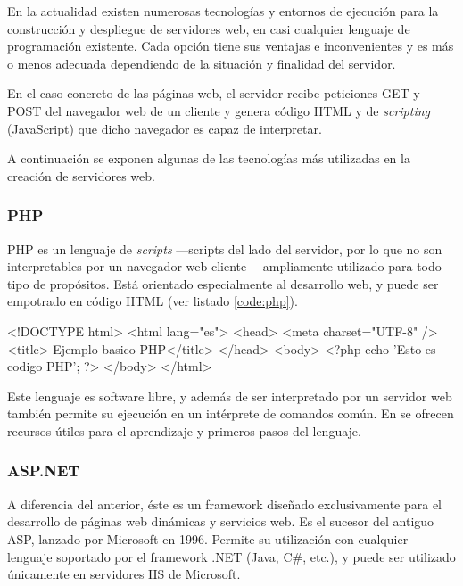 En la actualidad existen numerosas tecnologías y entornos de ejecución para la construcción y despliegue de servidores web, en casi cualquier lenguaje de programación existente. Cada opción tiene sus ventajas e inconvenientes y es más o menos adecuada dependiendo de la situación y finalidad del servidor.

En el caso concreto de las páginas web, el servidor recibe peticiones \acs{GET} y \acs{POST} del navegador web de un cliente y genera código \acs{HTML} y de {\it scripting} (JavaScript) que dicho navegador es capaz de interpretar.

A continuación se exponen algunas de las tecnologías más utilizadas en la creación de servidores web.

\subsubsection{PHP}

PHP es un lenguaje de {\it scripts} ---scripts del lado del servidor, por lo que no son interpretables por un navegador web cliente--- ampliamente utilizado para todo tipo de propósitos. Está orientado especialmente al desarrollo web, y puede ser empotrado en código \acs{HTML} (ver listado \ref{code:php}).

\begin{listing}[language=html, caption={Ejemplo de inclusión de código PHP en HTML}, label=code:php]
<!DOCTYPE html>
<html lang="es">
    <head>
        <meta charset="UTF-8" />
        <title> Ejemplo basico PHP</title>
    </head>
    <body>
        <?php
            echo 'Esto es codigo PHP';
        ?>
    </body>
</html>
\end{listing}

Este lenguaje es software libre, y además de ser interpretado por un servidor web también permite su ejecución en un intérprete de comandos común. En \cite{php} se ofrecen recursos útiles para el aprendizaje y primeros pasos del lenguaje.

\subsubsection{ASP.NET}

A diferencia del anterior, éste es un framework diseñado exclusivamente para el desarrollo de páginas web dinámicas y servicios web. Es el sucesor del antiguo \acs{ASP}, lanzado por Microsoft en 1996. Permite su utilización con cualquier lenguaje soportado por el framework .NET (Java, C\#, etc.), y puede ser utilizado únicamente en servidores \acs{IIS} de Microsoft.

